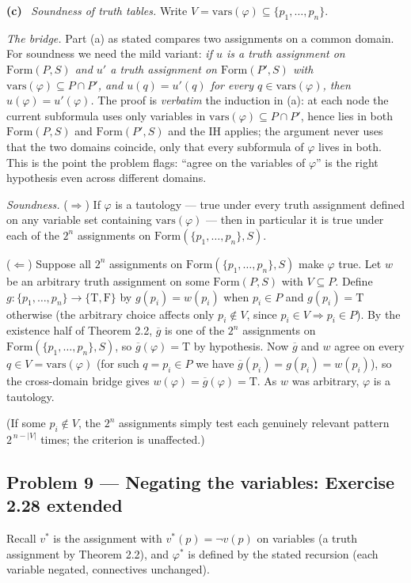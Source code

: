 \documentclass[11pt]{article}
\newcommand{\Form}{\mathrm{Form}}
\newcommand{\T}{\mathrm{T}}
\newcommand{\F}{\mathrm{F}}
\newcommand{\TF}{\{\T,\F\}}
\newcommand{\ext}[1]{\overline{#1}}
\newcommand{\vars}{\mathrm{vars}}
\newcommand{\solpart}[1]{\smallskip\noindent\textbf{(#1)}\ }
\newcommand{\prob}[2]{\subsection*{Problem #1 --- #2}}
\begin{document}
\solpart{c} \emph{Soundness of truth tables.} Write $V=\vars(\varphi)\subseteq
\{p_1,\dots,p_n\}$.

\emph{The bridge.} Part (a) as stated compares two assignments on a common domain.
For soundness we need the mild variant: \emph{if $u$ is a truth assignment on
$\Form(P,S)$ and $u'$ a truth assignment on $\Form(P',S)$ with $\vars(\varphi)
\subseteq P\cap P'$, and $u(q)=u'(q)$ for every $q\in\vars(\varphi)$, then
$u(\varphi)=u'(\varphi)$.} The proof is \emph{verbatim} the induction in (a): at
each node the current subformula uses only variables in $\vars(\varphi)\subseteq
P\cap P'$, hence lies in both $\Form(P,S)$ and $\Form(P',S)$ and the IH applies;
the argument never uses that the two domains coincide, only that every subformula
of $\varphi$ lives in both. This is the point the problem flags: ``agree on the
variables of $\varphi$'' is the right hypothesis even across different domains.

\emph{Soundness.} ($\Rightarrow$) If $\varphi$ is a tautology --- true under every
truth assignment defined on any variable set containing $\vars(\varphi)$ --- then
in particular it is true under each of the $2^n$ assignments on
$\Form(\{p_1,\dots,p_n\},S)$.

($\Leftarrow$) Suppose all $2^n$ assignments on $\Form(\{p_1,\dots,p_n\},S)$ make
$\varphi$ true. Let $w$ be an arbitrary truth assignment on some $\Form(P,S)$ with
$V\subseteq P$. Define $g\colon\{p_1,\dots,p_n\}\to\TF$ by $g(p_i)=w(p_i)$ when
$p_i\in P$ and $g(p_i)=\T$ otherwise (the arbitrary choice affects only $p_i\notin
V$, since $p_i\in V\Rightarrow p_i\in P$). By the existence half of Theorem 2.2,
$\ext{g}$ is one of the $2^n$ assignments on $\Form(\{p_1,\dots,p_n\},S)$, so
$\ext{g}(\varphi)=\T$ by hypothesis. Now $\ext{g}$ and $w$ agree on every
$q\in V=\vars(\varphi)$ (for such $q=p_i\in P$ we have $\ext{g}(p_i)=g(p_i)=
w(p_i)$), so the cross-domain bridge gives $w(\varphi)=\ext{g}(\varphi)=\T$. As $w$
was arbitrary, $\varphi$ is a tautology.

(If some $p_i\notin V$, the $2^n$ assignments simply test each genuinely relevant
pattern $2^{\,n-|V|}$ times; the criterion is unaffected.)

\prob{9}{Negating the variables: Exercise 2.28 extended}

Recall $v^*$ is the assignment with $v^*(p)=\lnot v(p)$ on variables (a truth
assignment by Theorem 2.2), and $\varphi^*$ is defined by the stated recursion
(each variable negated, connectives unchanged).
\end{document}
